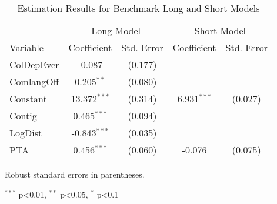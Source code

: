 
\begin{table}[H]
    \centering
    \begin{threeparttable}
        \begin{tabular}{lcccc}
            \toprule
            & \multicolumn{2}{c}{Long Model} & \multicolumn{2}{c}{Short Model} \\
            \cmidrule(lr){2-3} \cmidrule(lr){4-5}
            Variable & Coefficient & Std. Error & Coefficient & Std. Error \\
            \midrule
            ColDepEver & -0.087 & (0.177) &  &  \\
            ComlangOff & 0.205$^{\ast\ast}$ & (0.080) &  &  \\
            Constant & 13.372$^{\ast\ast\ast}$ & (0.314) & 6.931$^{\ast\ast\ast}$ & (0.027) \\
            Contig & 0.465$^{\ast\ast\ast}$ & (0.094) &  &  \\
            LogDist & -0.843$^{\ast\ast\ast}$ & (0.035) &  &  \\
            PTA & 0.456$^{\ast\ast\ast}$ & (0.060) & -0.076 & (0.075) \\

            \bottomrule
        \end{tabular}
        \begin{tablenotes}
            \footnotesize
            \item Robust standard errors in parentheses.
            \item $^{\ast\ast\ast}$ p<0.01, $^{\ast\ast}$ p<0.05, $^{\ast}$ p<0.1
        \end{tablenotes}
    \end{threeparttable}
    \caption{Estimation Results for Benchmark Long and Short Models}
    \label{tab:ns_ss_post_model}
\end{table}
